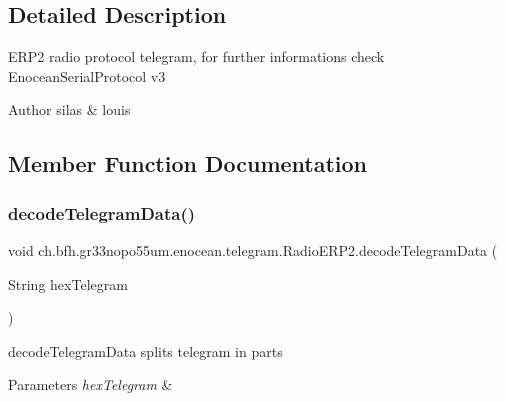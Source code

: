 \subsection{Detailed Description}
E\+R\+P2 radio protocol telegram, for further informations check Enocean\+Serial\+Protocol v3

\begin{DoxyAuthor}{Author}
silas \& louis 
\end{DoxyAuthor}


\subsection{Member Function Documentation}
\hypertarget{classch_1_1bfh_1_1gr33nopo55um_1_1enocean_1_1telegram_1_1_radio_e_r_p2_afe767e470db5d4d4473da7696e688f48}{}\label{classch_1_1bfh_1_1gr33nopo55um_1_1enocean_1_1telegram_1_1_radio_e_r_p2_afe767e470db5d4d4473da7696e688f48} 
\subsubsection{\texorpdfstring{decode\+Telegram\+Data()}{decodeTelegramData()}}
{\footnotesize\ttfamily void ch.\+bfh.\+gr33nopo55um.\+enocean.\+telegram.\+Radio\+E\+R\+P2.\+decode\+Telegram\+Data (\begin{DoxyParamCaption}\item[{String}]{hex\+Telegram }\end{DoxyParamCaption})}

decode\+Telegram\+Data splits telegram in parts


\begin{DoxyParams}{Parameters}
{\em hex\+Telegram} & \\
\hline
\end{DoxyParams}
\hypertarget{classch_1_1bfh_1_1gr33nopo55um_1_1enocean_1_1telegram_1_1_radio_e_r_p2_a30a3c4c9017f752d521dde8bee4efb99}{}\label{classch_1_1bfh_1_1gr33nopo55um_1_1enocean_1_1telegram_1_1_radio_e_r_p2_a30a3c4c9017f752d521dde8bee4efb99} 
